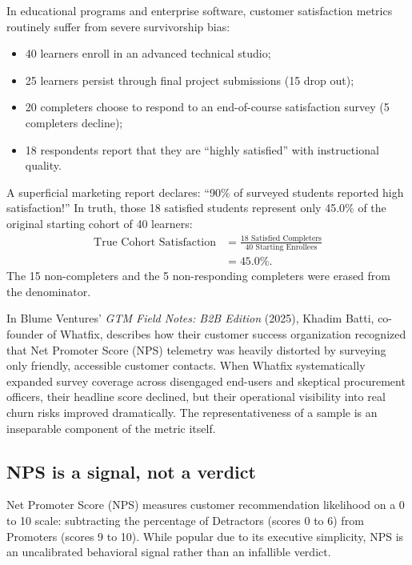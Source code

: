 In educational programs and enterprise software, customer satisfaction metrics routinely suffer from severe survivorship bias:
\begin{itemize}
\item 40 learners enroll in an advanced technical studio;
\item 25 learners persist through final project submissions (15 drop out);
\item 20 completers choose to respond to an end-of-course satisfaction survey (5 completers decline);
\item 18 respondents report that they are ``highly satisfied'' with instructional quality.
\end{itemize}
A superficial marketing report declares: ``90\% of surveyed students reported high satisfaction!'' In truth, those 18 satisfied students represent only 45.0\% of the original starting cohort of 40 learners:
\begin{equation}
\begin{aligned}
\text{True Cohort Satisfaction} &= \frac{18 \text{ Satisfied Completers}}{40 \text{ Starting Enrollees}} \\
&= 45.0\%.
\end{aligned}
\end{equation}
The 15 non-completers and the 5 non-responding completers were erased from the denominator.

In Blume Ventures' \textit{GTM Field Notes: B2B Edition} (2025), Khadim Batti, co-founder of Whatfix, describes how their customer success organization recognized that Net Promoter Score (NPS) telemetry was heavily distorted by surveying only friendly, accessible customer contacts. When Whatfix systematically expanded survey coverage across disengaged end-users and skeptical procurement officers, their headline score declined, but their operational visibility into real churn risks improved dramatically. The representativeness of a sample is an inseparable component of the metric itself.

\subsection{NPS is a signal, not a verdict}

Net Promoter Score (NPS) measures customer recommendation likelihood on a 0 to 10 scale: subtracting the percentage of Detractors (scores 0 to 6) from Promoters (scores 9 to 10). While popular due to its executive simplicity, NPS is an uncalibrated behavioral signal rather than an infallible verdict.

